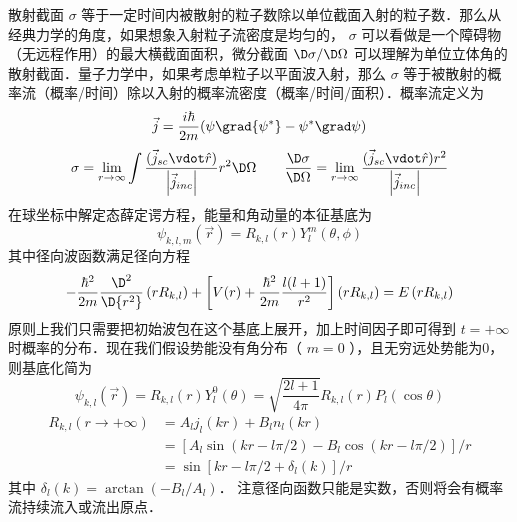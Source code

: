 
散射截面 $\sigma$ 等于一定时间内被散射的粒子数除以单位截面入射的粒子数．那么从经典力学的角度，如果想象入射粒子流密度是均匀的， $\sigma$ 可以看做是一个障碍物（无远程作用）的最大横截面面积，微分截面 $\D \sigma/\D\Omega$ 可以理解为单位立体角的散射截面．量子力学中，如果考虑单粒子以平面波入射，那么 $\sigma$ 等于被散射的概率流（概率/时间）除以入射的概率流密度（概率/时间/面积）．概率流定义为
\begin{equation}
\vec j = \frac{{i\hbar }}{{2m}}(\psi \grad {\psi ^ * } - {\psi ^ * }\grad \psi )
\end{equation}
\begin{equation}\label{ParWav_eq3}
\sigma  = \lim_{r \to \infty } \int {\frac{{{\text{(}}{{\vec j}_{sc}} \vdot \hat r{\text{)}}}}{{\left| {{{\vec j}_{inc}}} \right|}}{r^2}\D \Omega } 
\qquad
\frac{{\D \sigma }}{{\D \Omega }} = \lim_{r \to \infty } \frac{{{\text{(}}{{\vec j}_{sc}} \vdot \hat r{\text{)}}{r^2}}}{{\left| {{{\vec j}_{inc}}} \right|}}
\end{equation}
在球坐标中解定态薛定谔方程，能量和角动量的本征基底为
\begin{equation}
{\psi_{k,l,m}}(\vec r) = {R_{k,l}}(r)Y_l^m(\theta ,\phi )
\end{equation}
其中径向波函数满足径向方程
\begin{equation}\label{ParWav_eq4}
- \frac{{{\hbar ^2}}}{{2m}}\frac{{{\D ^2}}}{{\D {r^2}}}\left( {r{R_{k,l}}} \right) + \left[ {V(r) + \frac{{{\hbar ^2}}}{{2m}}\frac{{l(l + 1)}}{{{r^2}}}} \right]\left( {r{R_{k,l}}} \right) = E\left( {r{R_{k,l}}} \right)
\end{equation}
原则上我们只需要把初始波包在这个基底上展开，加上时间因子即可得到 $t =  + \infty$ 时概率的分布．现在我们假设势能没有角分布（ $m = 0$ ），且无穷远处势能为0，则基底化简为
\begin{equation}
{\psi_{k,l}}(\vec r) = {R_{k,l}}(r)Y_l^0(\theta ) = \sqrt {\frac{{2l + 1}}{{4\pi }}} {R_{k,l}}(r){P_l}(\cos \theta )
\end{equation}
\begin{equation}\begin{aligned}\label{ParWav_eq6}
{R_{k,l}}(r \to  + \infty ) &= {A_l}{j_l}(kr) + {B_l}{n_l}(kr) \\
&= [{A_l}\sin (kr - l\pi /2) - {B_l}\cos(kr - l\pi /2)]/r \\
&= \sin [kr - l\pi /2 + {\delta_l}(k)]/r
\end{aligned}\end{equation}
其中 ${\delta_l}(k) = \arctan ( { - {B_l}/{A_l}} )$． 注意径向函数只能是实数，否则将会有概率流持续流入或流出原点．

